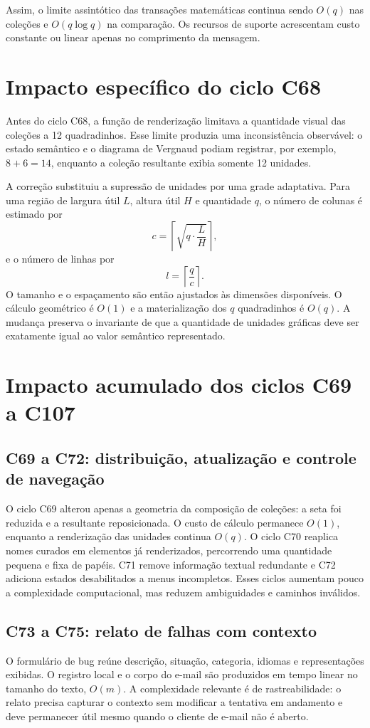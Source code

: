 \documentclass[12pt,a4paper]{article}
\begin{document}
Assim, o limite assintótico das transações matemáticas continua sendo $O(q)$ nas coleções e $O(q\log q)$ na comparação. Os recursos de suporte acrescentam custo constante ou linear apenas no comprimento da mensagem.

\section{Impacto específico do ciclo C68}

Antes do ciclo C68, a função de renderização limitava a quantidade visual das coleções a 12 quadradinhos. Esse limite produzia uma inconsistência observável: o estado semântico e o diagrama de Vergnaud podiam registrar, por exemplo, $8+6=14$, enquanto a coleção resultante exibia somente 12 unidades.

A correção substituiu a supressão de unidades por uma grade adaptativa. Para uma região de largura útil $L$, altura útil $H$ e quantidade $q$, o número de colunas é estimado por
\[
c=\left\lceil\sqrt{q\cdot\frac{L}{H}}\right\rceil,
\]
e o número de linhas por
\[
l=\left\lceil\frac{q}{c}\right\rceil.
\]
O tamanho e o espaçamento são então ajustados às dimensões disponíveis. O cálculo geométrico é $O(1)$ e a materialização dos $q$ quadradinhos é $O(q)$. A mudança preserva o invariante de que a quantidade de unidades gráficas deve ser exatamente igual ao valor semântico representado.


\section{Impacto acumulado dos ciclos C69 a C107}

\subsection{C69 a C72: distribuição, atualização e controle de navegação}
O ciclo C69 alterou apenas a geometria da composição de coleções: a seta foi reduzida e a resultante reposicionada. O custo de cálculo permanece $O(1)$, enquanto a renderização das unidades continua $O(q)$. O ciclo C70 reaplica nomes curados em elementos já renderizados, percorrendo uma quantidade pequena e fixa de papéis. C71 remove informação textual redundante e C72 adiciona estados desabilitados a menus incompletos. Esses ciclos aumentam pouco a complexidade computacional, mas reduzem ambiguidades e caminhos inválidos.

\subsection{C73 a C75: relato de falhas com contexto}
O formulário de bug reúne descrição, situação, categoria, idiomas e representações exibidas. O registro local e o corpo do e-mail são produzidos em tempo linear no tamanho do texto, $O(m)$. A complexidade relevante é de rastreabilidade: o relato precisa capturar o contexto sem modificar a tentativa em andamento e deve permanecer útil mesmo quando o cliente de e-mail não é aberto.
\end{document}
